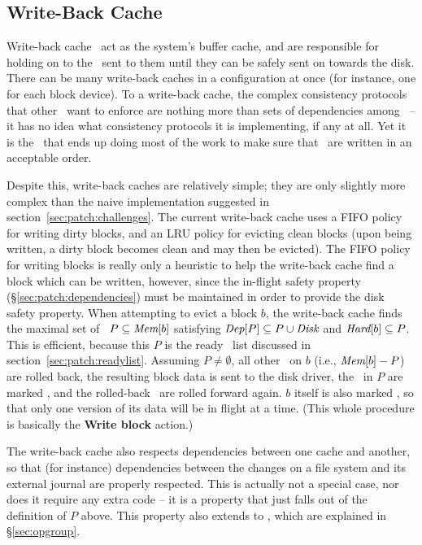 \subsection{Write-Back Cache}
\label{sec:using:wbcache}

Write-back cache \modules\ act as the system's buffer cache, and are responsible
for holding on to the \chdescs\ sent to them until they can be safely sent on
towards the disk. There can be many write-back caches in a configuration at once
(for instance, one for each block device). To a write-back cache, the complex
consistency protocols that other \modules\ want to enforce are nothing more than
sets of dependencies among \chdescs\ -- it has no idea what consistency
protocols it is implementing, if any at all. Yet it is the \module\ that ends up
doing most of the work to make sure that \chdescs\ are written in an acceptable
order.

Despite this, write-back caches are relatively simple; they are only slightly
more complex than the naive implementation suggested in
section~\ref{sec:patch:challenges}. The current write-back cache uses a FIFO
policy for writing dirty blocks, and an LRU policy for evicting clean blocks
(upon being written, a dirty block becomes clean and may then be evicted).
%
The FIFO policy for writing blocks is really only a heuristic to help the
write-back cache find a block which can be written, however, since the in-flight
safety property (\S\ref{sec:patch:dependencies}) must be maintained in order to
provide the disk safety property. When attempting to evict a block $b$, the
write-back cache finds the maximal set of \chdescs\ $P \subseteq \PMem[b]$
satisfying
%
$\PDepset{P} \subseteq P \cup \PDisk$ and $\PHard[b] \subseteq P$.
%
This is efficient, because this $P$ is the ready \chdesc\ list discussed in
section~\ref{sec:patch:readylist}.
%
Assuming $P \neq \emptyset$, all other \chdescs\ on $b$ (i.e., $\PMem[b] - P$)
are rolled back, the resulting block data is sent to the disk driver, the
\chdescs\ in $P$ are marked \PInfst, and the rolled-back \chdescs\ are rolled
forward again. $b$ itself is also marked \PInfst, so that only one version of
its data will be in flight at a time. (This whole procedure is basically the
\textbf{Write block} action.)

The write-back cache also respects dependencies between one cache and another,
so that (for instance) dependencies between the changes on a file system and its
external journal are properly respected. This is actually not a special case,
nor does it require any extra code -- it is a property that just falls out of
the definition of $P$ above. This property also extends to \opgroups, which are
explained in \S\ref{sec:opgroup}.
